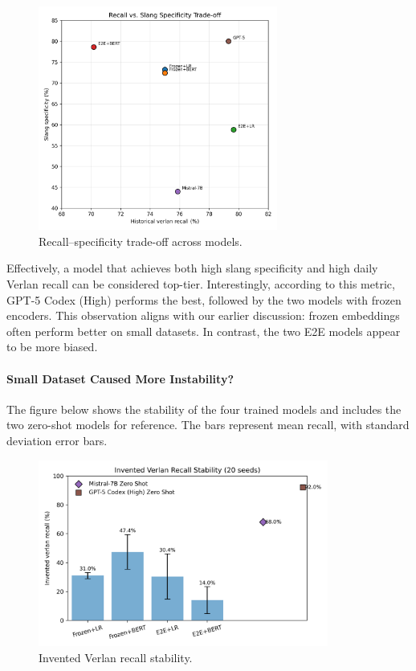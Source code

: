 \documentclass[12pt]{article}
\begin{document}
\begin{figure}[H]
    \centering
    \includegraphics[width=0.7\textwidth]{figures/historical_vs_slang_tradeoff.png}
    \caption{Recall--specificity trade-off across models.}
    \label{fig:tradeoff-scatter}
\end{figure}

Effectively, a model that achieves both high slang specificity and high daily Verlan recall can be considered top-tier. 
Interestingly, according to this metric, GPT-5 Codex (High) performs the best, followed by the two models with frozen encoders. 
This observation aligns with our earlier discussion: frozen embeddings often perform better on small datasets. 
In contrast, the two E2E models appear to be more biased.

\paragraph{Small Dataset Caused More Instability?}

The figure below shows the stability of the four trained models and includes the two zero-shot models for reference. 
The bars represent mean recall, with standard deviation error bars.

\begin{figure}[H]
    \centering
    \includegraphics[width=0.85\textwidth]{figures/invented_recall_variance.png}
    \caption{Invented Verlan recall stability.}
    \label{fig:invented-variance}
\end{figure}
\end{document}
